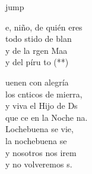 \begin{cancion}jump\\
	\begin{chorus}%
		e, niño, de quién eres\\
		todo stido de blan \\
		y de la rgen Maa\\
		y del píru to (**)\jump\\
	\end{chorus}%
	uenen con alegría\\
	los cnticos de mierra,\\
	y viva el Hijo de Ds\\
	que ce en la Noche na.\\
	\jump
	Lochebuena se vie,\\
	la nochebuena se  \\
	y nosotros nos irem \\
	y no volveremos s.\\
\end{cancion}%
